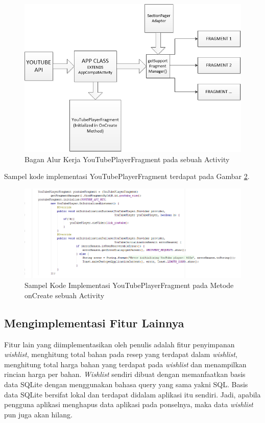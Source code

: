  		\begin{figure}[H]
			\centering
			\includegraphics[width=1\textwidth]{gambar/new/youtube_player_fragment}
			\caption{Bagan Alur Kerja YouTubePlayerFragment pada sebuah Activity}
			\label{youtube-player-frag}
		\end{figure}
		\vspace{1cm}
		Sampel kode implementasi YouTubePlayerFragment terdapat pada Gambar \ref{youtube-frag-sampel}.
 		\begin{figure}[H]
			\centering
			\includegraphics[width=1\textwidth]{gambar/new/youtube_fragment}
			\caption{Sampel Kode Implementasi YouTubePlayerFragment pada Metode onCreate sebuah Activity}
			\label{youtube-frag-sampel}
		\end{figure}
	\subsection{Mengimplementasi Fitur Lainnya}
		Fitur lain yang diimplementasikan oleh penulis adalah fitur penyimpanan \textit{wishlist}, menghitung total bahan pada resep yang terdapat dalam \textit{wishlist}, menghitung total harga bahan yang terdapat pada \textit{wishlist} dan menampilkan rincian harga per bahan. \textit{Wishlist} sendiri dibuat dengan memanfaatkan basis data SQLite dengan menggunakan bahasa query yang sama yakni SQL. Basis data SQLite bersifat lokal dan terdapat didalam aplikasi itu sendiri. Jadi, apabila pengguna aplikasi menghapus data aplikasi pada ponselnya, maka data \textit{wishlist} pun juga akan hilang.
		
